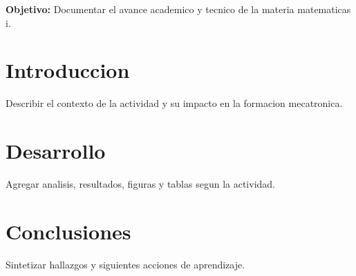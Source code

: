 \documentclass[spanish,letterpaper,oneside]{article}
\begin{document}
\templatePortrait
\templatePagecfg
\onehalfspacing

\begin{abstractd}
\textbf{Objetivo:} Documentar el avance academico y tecnico de la materia matematicas i.
\end{abstractd}

\templateIndex
\templateFinalcfg

\section{Introduccion}
Describir el contexto de la actividad y su impacto en la formacion mecatronica.

\section{Desarrollo}
Agregar analisis, resultados, figuras y tablas segun la actividad.

\section{Conclusiones}
Sintetizar hallazgos y siguientes acciones de aprendizaje.



\end{document}
